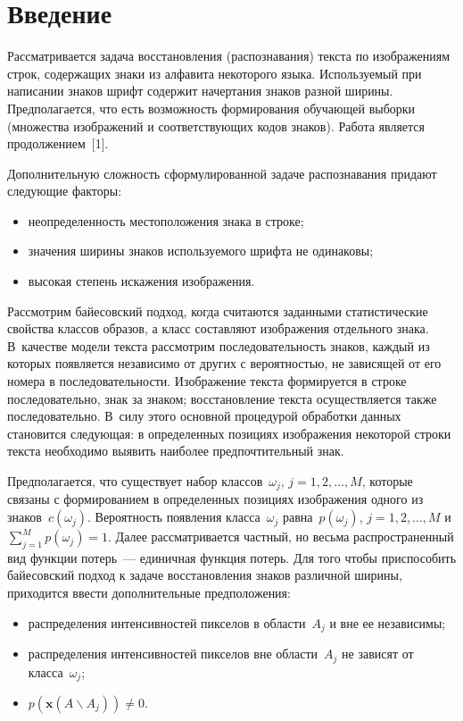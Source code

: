       \begin{multicols}{2}

      \label{st\stat}

\section{Введение}
      
      Рассматривается задача восстановления (распознавания) текста по изображениям строк, 
содержащих знаки из алфавита некоторого языка. Используемый при написании знаков шрифт 
содержит\linebreak
 начертания знаков разной ширины. Пред\-по\-лагается, что есть возможность 
формирования обуча\-ющей выборки (множества изображений и соответствующих кодов знаков). 
Работа является продолжением~[1].
      
      Дополнительную сложность сформулированной задаче распознавания придают следующие 
факторы:
      \begin{itemize}
\item неопределенность местоположения знака в строке;
\item значения ширины знаков используемого шрифта не одинаковы;
\item высокая степень искажения изображения.
\end{itemize}

      Рассмотрим байесовский подход, когда считаются заданными статистические свойства 
классов образов, а класс составляют изображения отдельного знака. В~качестве модели текста 
рассмотрим последовательность знаков, каждый из которых появляется независимо от других с 
вероятностью, не зависящей от его номера в последовательности. Изображение текста 
формируется в строке последовательно, знак за знаком; восстановление текста осуществляется 
также последовательно. В~силу этого основной процедурой обработки данных становится 
следующая: в определенных позициях изображения некоторой строки текста необходимо выявить 
наиболее предпочтительный знак.
      
      Предполагается, что существует набор классов~$\omega_j$, $j=1, 2, \ldots ,M$, которые 
связаны с формированием в определенных позициях изображения одного из знаков~$c(\omega_j)$. 
Вероятность появления класса~$\omega_j$ равна~$p(\omega_j)$, $j=1, 2, \ldots , M$ и  
$\sum\limits_{j=1}^M p(\omega_j)=1$. Далее рассматривается частный, но весьма 
распространенный вид функции потерь~--- единичная функция потерь. Для того чтобы 
приспособить байе\-сов\-ский подход к задаче восстановления знаков различной ширины, 
приходится ввести дополнительные предположения:
      \begin{itemize}
\item  распределения интенсивностей пикселов в области~$A_j$ и вне ее независимы;
\item распределения интенсивностей пикселов вне области~$A_j$ не зависят от 
класса~$\omega_j$;
\item  $p(\mathbf{x}(A\backslash A_j))\not= 0$.
\end{itemize}


\end{multicols}
